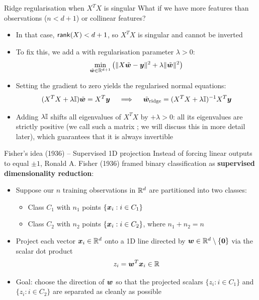 \documentclass[aspectratio=169]{beamer}\usepackage[]{graphicx}\usepackage[]{xcolor}
\begin{document}
\begin{frame}{Ridge regularisation when $X^T X$ is singular}
    What if we have more features than observations ($n < d + 1$) or collinear features?
    \vfill
    \begin{itemize}
        \item In that case, $\mathsf{rank}(X) < d + 1$, so $X^T X$ is singular and cannot be inverted
        \vfill
        \item To fix this, we add a  with regularisation parameter $\lambda > 0$:
        \[
            \min_{\tilde{\bm{w}} \in \mathbb{R}^{d+1}} \left(\|X\tilde{\bm{w}} - \bm{y}\|^2 + \lambda \|\tilde{\bm{w}}\|^2\right)
        \]
        \vfill
        \item Setting the gradient to zero yields the regularised normal equations:
        \[
            (X^T X + \lambda \mathbb{I}) \tilde{\bm{w}} = X^T \bm{y} \quad \implies \quad \tilde{\bm{w}}_{\text{ridge}} = (X^T X + \lambda \mathbb{I})^{-1} X^T \bm{y}
        \]
        \vfill
        \item Adding $\lambda \mathbb{I}$ shifts all eigenvalues of $X^T X$ by $+\lambda > 0$: all its eigenvalues are strictly positive (we call such a matrix ; we will discuss this in more detail later), which guarantees that it is always invertible
    \end{itemize}
\end{frame}




\begin{frame}{Fisher's idea (1936) -- Supervised 1D projection}
    Instead of forcing linear outputs to equal $\pm 1$, Ronald A. Fisher (1936) framed binary classification as \textbf{supervised dimensionality reduction}:
    \vfill
    \begin{itemize}
        \item Suppose our $n$ training observations in $\mathbb{R}^d$ are partitioned into two classes:
        \begin{itemize}
            \item Class $C_1$ with $n_1$ points $\{\bm{x}_i : i \in C_1\}$
            \item Class $C_2$ with $n_2$ points $\{\bm{x}_i : i \in C_2\}$, where $n_1 + n_2 = n$
        \end{itemize}
        \vfill
        \item Project each vector $\bm{x}_i \in \mathbb{R}^d$ onto a 1D line directed by $\bw \in \IR^d \setminus \{\b0\}$ via the scalar dot product
        \[
            z_i = \bm{w}^T \bm{x}_i \in \mathbb{R}
        \]
        \vfill
        \item Goal: choose the direction of $\bm{w}$ so that the projected scalars $\{z_i : i \in C_1\}$ and $\{z_i : i \in C_2\}$ are separated as cleanly as possible
    \end{itemize}
\end{frame}
\end{document}
